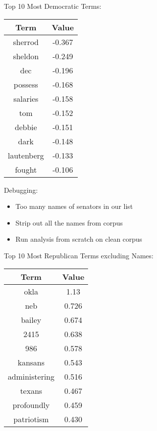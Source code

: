 \documentclass[xcolor=pdftex,dvipsnames,table]{beamer}
\begin{document}
\frame
{
	Top 10 Most Democratic Terms:
	\begin{table}[htdp]
	\begin{center}
	\begin{tabular}{|c|c|}
	\hline
	Term & Value \\ 
	\hline
	sherrod & -0.367 \\
	sheldon & -0.249 \\
	dec & -0.196 \\
	possess & -0.168 \\
	salaries & -0.158 \\
	tom & -0.152 \\
	debbie & -0.151 \\
	dark & -0.148 \\
	lautenberg & -0.133 \\
	fought & -0.106 \\
	\hline
	\end{tabular}
	\end{center}
	\label{default}
	\end{table}
}

\frame
{
	Debugging:
	\begin{itemize}
		\item{Too many names of senators in our list}
		\item{Strip out all the names from corpus}
		\item{Run analysis from scratch on clean corpus}
	\end{itemize}
}

\frame
{
	Top 10 Most Republican Terms excluding Names:
	\begin{table}[htdp]
	\begin{center}
	\begin{tabular}{|c|c|}
	\hline
	Term & Value \\ 
	\hline
	okla & 1.13 \\
	neb & 0.726 \\
	bailey & 0.674 \\
	2415 & 0.638 \\
	986 & 0.578 \\
	kansans & 0.543 \\
	administering & 0.516 \\
	texans & 0.467 \\
	profoundly & 0.459 \\
	patriotism & 0.430 \\
	\hline
	\end{tabular}
	\end{center}
	\label{default}
	\end{table}
}
\end{document}
